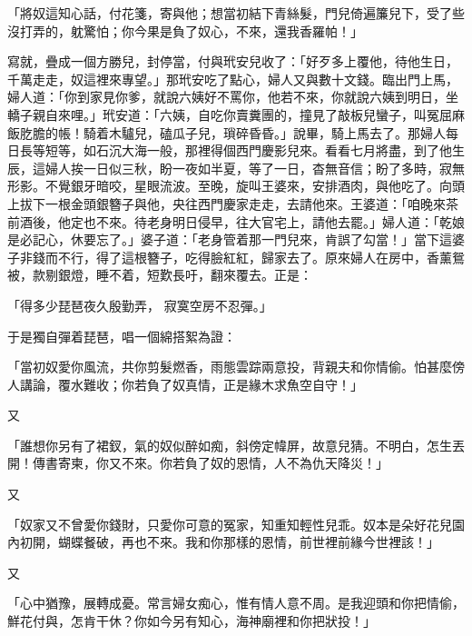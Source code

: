 \begin{showcontents}{}
「將奴這知心話，付花箋，寄與他；想當初結下青絲髮，門兒倚遍簾兒下，受了些沒打弄的，躭驚怕；你今果是負了奴心，不來，還我香羅帕！」

寫就，疊成一個方勝兒，封停當，付與玳安兒收了：「好歹多上覆他，待他生日，千萬走走，奴這裡來專望。」那玳安吃了點心，婦人又與數十文錢。臨出門上馬，婦人道：「你到家見你爹，就說六姨好不罵你，他若不來，你就說六姨到明日，坐轎子親自來哩。」玳安道：「六姨，自吃你賣糞團的，撞見了敲板兒蠻子，叫冤屈麻飯肐膽的帳！騎着木驢兒，磕瓜子兒，瑣碎昏昏。」說畢，騎上馬去了。那婦人每日長等短等，如石沉大海一般，那裡得個西門慶影兒來。看看七月將盡，到了他生辰，這婦人挨一日似三秋，盼一夜如半夏，等了一日，杳無音信；盼了多時，寂無形影。不覺銀牙暗咬，星眼流波。至晚，旋叫王婆來，安排酒肉，與他吃了。向頭上拔下一根金頭銀簪子與他，央往西門慶家走走，去請他來。王婆道：「咱晚來茶前酒後，他定也不來。待老身明日侵早，往大官宅上，請他去罷。」婦人道：「乾娘是必記心，休要忘了。」婆子道：「老身管着那一門兒來，肯誤了勾當！」當下這婆子非錢而不行，得了這根簪子，吃得臉紅紅，歸家去了。原來婦人在房中，香薰鴛被，款剔銀燈，睡不着，短歎長吁，翻來覆去。正是：

「得多少琵琶夜久殷勤弄，  寂寞空房不忍彈。」

于是獨自彈着琵琶，唱一個綿搭絮為證：

「當初奴愛你風流，共你剪髮燃香，雨態雲踪兩意投，背親夫和你情偷。怕甚麼傍人講論，覆水難收；你若負了奴真情，正是緣木求魚空自守！」

又

「誰想你另有了裙釵，氣的奴似醉如痴，斜傍定幃屏，故意兒猜。不明白，怎生丟開！傳書寄柬，你又不來。你若負了奴的恩情，人不為仇天降災！」

又

「奴家又不曾愛你錢財，只愛你可意的冤家，知重知輕性兒乖。奴本是朵好花兒園內初開，蝴蝶餐破，再也不來。我和你那樣的恩情，前世裡前緣今世裡該！」

又

「心中猶豫，展轉成憂。常言婦女痴心，惟有情人意不周。是我迎頭和你把情偷，鮮花付與，怎肯干休？你如今另有知心，海神廟裡和你把狀投！」


\end{showcontents}
